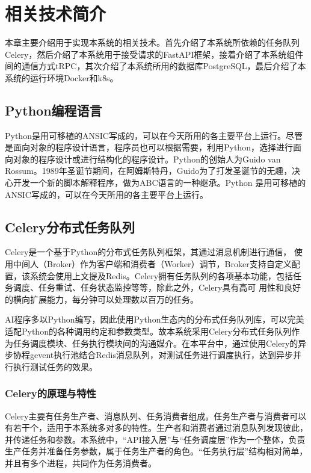 \chapter{相关技术简介}

本章主要介绍用于实现本系统的相关技术。首先介绍了本系统所依赖的任务队列Celery，然后介绍了本系统用于接受请求的FastAPI框架，接着介绍了本系统组件间的通信方式tRPC，其次介绍了本系统所用的数据库PostgreSQL，最后介绍了本系统的运行环境Docker和k8s。

\section{Python编程语言}

Python是用可移植的ANSIC写成的，可以在今天所用的各主要平台上运行。尽管是面向对象的程序设计语言，程序员也可以根据需要，利用Python，选择进行面向对象的程序设计或进行结构化的程序设计\cite{11, 13}。Python的创始人为Guido van Rossum。1989年圣诞节期间，在阿姆斯特丹，Guido为了打发圣诞节的无趣，决心开发一个新的脚本解释程序，做为ABC语言的一种继承\cite{12}。Python 是用可移植的ANSIC写成的，可以在今天所用的各主要平台上运行。

\section{Celery分布式任务队列}

Celery是一个基于Python的分布式任务队列框架，其通过消息机制进行通信， 使用中间人（Broker）作为客户端和消费者（Worker）调节，Broker支持自定义配置，该系统会使用上文提及Redis。Celery拥有任务队列的各项基本功能，包括任务调度、任务重试、任务状态监控等等，除此之外，Celery具有高可 用性和良好的横向扩展能力，每分钟可以处理数以百万的任务\cite{1}。

AI程序多以Python编写，因此使用Python生态内的分布式任务队列库，可以完美适配Python的各种调用约定和参数类型。故本系统采用Celery分布式任务队列作为任务调度模块、任务执行模块间的沟通媒介。在本平台中，通过使用Celery的异步协程gevent执行池结合Redis消息队列，对测试任务进行调度执行，达到异步并行执行测试任务的效果\cite{14}。

\subsection{Celery的原理与特性}

Celery主要有任务生产者、消息队列、任务消费者组成。任务生产者与消费者可以有若干个，适用于本系统多对多的特性。生产者和消费者通过消息队列发现彼此，并传递任务和参数。本系统中，“API接入层”与“任务调度层”作为一个整体，负责生产任务并准备任务参数，属于任务生产者的角色。“任务执行层”结构相对简单，并且有多个进程，共同作为任务消费者。


